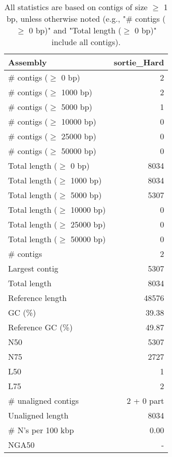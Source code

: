 \documentclass[12pt,a4paper]{article}
\begin{document}
\begin{table}[ht]
\begin{center}
\caption{All statistics are based on contigs of size $\geq$ 1 bp, unless otherwise noted (e.g., "\# contigs ($\geq$ 0 bp)" and "Total length ($\geq$ 0 bp)" include all contigs).}
\begin{tabular}{|l*{1}{|r}|}
\hline
Assembly & sortie\_Hard \\ \hline
\# contigs ($\geq$ 0 bp) & 2 \\ \hline
\# contigs ($\geq$ 1000 bp) & 2 \\ \hline
\# contigs ($\geq$ 5000 bp) & 1 \\ \hline
\# contigs ($\geq$ 10000 bp) & 0 \\ \hline
\# contigs ($\geq$ 25000 bp) & 0 \\ \hline
\# contigs ($\geq$ 50000 bp) & 0 \\ \hline
Total length ($\geq$ 0 bp) & 8034 \\ \hline
Total length ($\geq$ 1000 bp) & 8034 \\ \hline
Total length ($\geq$ 5000 bp) & 5307 \\ \hline
Total length ($\geq$ 10000 bp) & 0 \\ \hline
Total length ($\geq$ 25000 bp) & 0 \\ \hline
Total length ($\geq$ 50000 bp) & 0 \\ \hline
\# contigs & 2 \\ \hline
Largest contig & 5307 \\ \hline
Total length & 8034 \\ \hline
Reference length & 48576 \\ \hline
GC (\%) & 39.38 \\ \hline
Reference GC (\%) & 49.87 \\ \hline
N50 & 5307 \\ \hline
N75 & 2727 \\ \hline
L50 & 1 \\ \hline
L75 & 2 \\ \hline
\# unaligned contigs & 2 + 0 part \\ \hline
Unaligned length & 8034 \\ \hline
\# N's per 100 kbp & 0.00 \\ \hline
NGA50 & - \\ \hline
\end{tabular}
\end{center}
\end{table}
\end{document}
